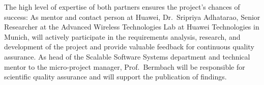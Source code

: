 The high level of expertise of both partners ensures the project's chances of success:
As mentor and contact person at Huawei, Dr.~Sripriya Adhatarao, Senior Researcher at the Advanced Wireless Technologies Lab at Huawei Technologies in Munich, will actively participate in the requirements analysis, research, and development of the project and provide valuable feedback for continuous quality assurance.
As head of the Scalable Software Systems department and technical mentor to the micro-project manager, Prof.~Bermbach will be responsible for scientific quality assurance and will support the publication of findings.
